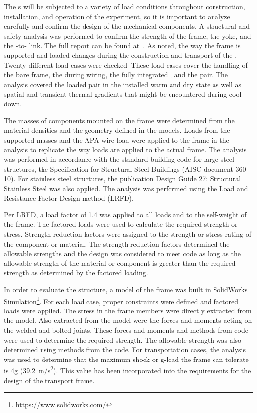 The s will be subjected to a variety of load conditions throughout construction, installation, and operation of the experiment, so it is important to analyze carefully and confirm the design of the mechanical components.  A structural and safety analysis was performed to confirm the strength of the  frame, the  yoke, and the -to- link.  The full report can be found at~\cite{bib:cernedms2100877}. %
As noted, the way the  frame is supported and loaded changes during the construction and transport of the . Twenty different load cases were checked.  These load cases cover the handling of the bare frame, the  during wiring, the fully integrated , and the  pair.  The analysis covered the loaded  pair in the installed warm and dry state as well as spatial and transient thermal gradients that might be encountered during cool down.

The masses of components mounted on the frame were determined from the material densities and the geometry defined in the \threed models.  Loads from the supported masses and the APA wire load were applied to the frame in the analysis to replicate the way loads are applied to the actual frame.  The analysis was performed in accordance with the standard building code for large steel structures, the  Specification for Structural Steel Buildings (AISC document 360-10). For stainless steel structures, the   publication Design Guide 27: Structural Stainless Steel was also applied.  The analysis was performed using the Load and Resistance Factor Design method (LRFD).

Per LRFD, a load factor of 1.4 was applied to all loads and to the self-weight of the   frame.  The factored loads were used to calculate the required strength or stress.  Strength reduction factors were assigned to the strength or stress rating of the component or material.  The strength reduction factors determined the allowable strengths and the design was considered to meet code as long as the allowable strength of the material or component is greater than the required strength as determined by the factored loading.

In order to evaluate the structure, a   model of the   frame was built in SolidWorks Simulation\footnote{\url{https://www.solidworks.com/}}.   For each load case, proper constraints were defined and factored loads were applied.  The stress in the frame members were directly extracted from the model.  Also extracted from the model were the forces and moments acting on the welded and bolted joints. These forces and moments and methods from code were used to determine the required strength.  The allowable strength was also determined using methods from the code.
For transportation cases, the analysis was used to determine that the maximum shock or g-load the   frame can tolerate is 4g (\SI{39.2}{m/s^2}).  This value has been incorporated into the requirements for the design of the transport frame.

